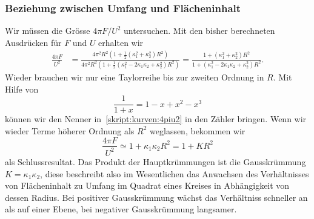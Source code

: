 \subsubsection{Beziehung zwischen Umfang und Flächeninhalt}
Wir müssen die Grösse $4\pi F/U^2$ untersuchen.
Mit den bisher berechneten Ausdrücken für $F$ und $U$ erhalten wir
\begin{align}
\frac{4\pi F}{U^2}
&=
\frac{4\pi^2R^2(1+{\textstyle\frac12}(\kappa_1^2 + \kappa_2^2)R^2)}%
{4\pi^2 R^2(1+{\textstyle\frac12}(\kappa_1^2-2\kappa_1\kappa_2+\kappa_2^2)R^2)}
=
\frac{1+(\kappa_1^2 + \kappa_2^2)R^2}%
{1+(\kappa_1^2-2\kappa_1\kappa_2+\kappa_2^2)R^2}.
\label{skript:kurven:4piu2}
\end{align}
Wieder brauchen wir nur eine Taylorreihe bis zur zweiten Ordnung in $R$.
Mit Hilfe von
\[
\frac1{1+x}= 1-x+x^2-x^3
\]
können wir den Nenner in~\eqref{skript:kurven:4piu2} in den Zähler
bringen.
Wenn wir wieder Terme höherer Ordnung als $R^2$ weglassen, bekommen
wir 
\begin{equation}
\frac{4\pi F}{U^2}
\simeq
1+\kappa_1\kappa_2R^2
=
1 + KR^2
\end{equation}
als Schlussresultat.
Das Produkt der Hauptkrümmungen ist die Gausskrümmung $K=\kappa_1\kappa_2$,
diese beschreibt also im Wesentlichen das Anwachsen des Verhältnisses
von Flächeninhalt zu Umfang im Quadrat eines Kreises in Abhängigkeit
von dessen Radius.
Bei positiver Gausskrümmung wächst das Verhältniss schneller an
als auf einer Ebene, bei negativer Gausskrümmung langsamer.






